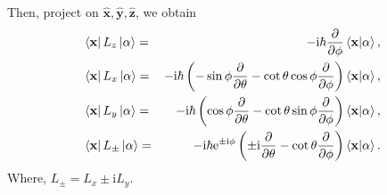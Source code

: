 \documentclass{article}
\theoremstyle{1}
\newcommand{\pa}{\partial}
\newcommand{\ii}{\mathrm{i}}
\newcommand{\ee}{\mathrm{e}}
\begin{document}
Then, project on $\hat{\mathbf{x}},\hat{\mathbf{y}},\hat{\mathbf{z}}$, we obtain
\begin{eqnarray}
    &\bra{\mathbf{x}}L_z\ket{\alpha}=&-\ii \hbar \pdv{\phi}\braket{\mathbf{x}}{\alpha},\\
    &\bra{\mathbf{x}}L_x\ket{\alpha}=&-\ii \hbar \left(-\sin \phi \pdv{\theta}-\cot\theta\cos\phi \pdv{\phi}\right)\braket{\mathbf{x}}{\alpha},\\
    &\bra{\mathbf{x}}L_y\ket{\alpha}=&-\ii \hbar \left(\cos \phi \pdv{\theta}-\cot\theta\sin\phi \pdv{\phi}\right)\braket{\mathbf{x}}{\alpha},\\
    &\bra{\mathbf{x}}L_\pm\ket{\alpha}=&-\ii\hbar \ee^{\pm \ii \phi}\left(\pm \ii\frac{\pa}{\pa \theta}-\cot \theta\frac{\pa}{\pa \phi}\right)\braket{\mathbf{x}}{\alpha}.\label{13.20}
\end{eqnarray}
Where, $L_\pm=L_x\pm \ii L_y$.
\end{document}
